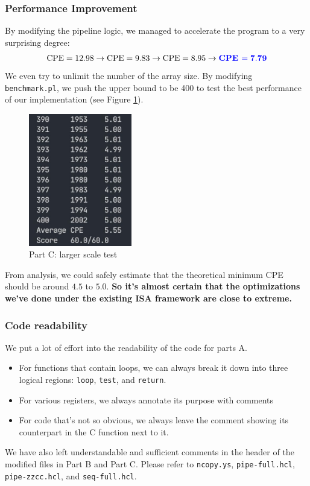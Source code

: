 \documentclass[12pt,a4paper]{article}
\begin{document}
\subsubsection{Performance Improvement}
By modifying the pipeline logic, we managed to accelerate the program to a very surprising degree:
$$
        \text{CPE} = 12.98 \rightarrow \text{CPE} = 9.83 \rightarrow \text{CPE} = 8.95 \rightarrow {\color{blue}\textbf{CPE }\mathbf{= 7.79}}
$$
We even try to unlimit the number of the array size. By modifying \texttt{benchmark.pl}, 
we push the upper bound to be 400 to test the best performance of our implementation (see Figure \ref{Fig.partC-limit}).
\begin{figure}[H] %
        \centering %
        \includegraphics[width=0.4\textwidth]{partC-larger-scale-test.jpg} %
        \caption{Part C: larger scale test} %
        \label{Fig.partC-limit} %
\end{figure}
From analysis, we could safely estimate that the theoretical minimum CPE should be around $4.5$ to $5.0$. \textbf{So it's almost certain that the optimizations we've done under the existing ISA framework are close to extreme.}
\subsubsection{Code readability}
We put a lot of effort into the readability of the code for parts A.
\begin{itemize}
        \item For functions that contain loops, we can always break it down into three logical regions: \texttt{loop}, \texttt{test}, and \texttt{return}.
        \item For various registers, we always annotate its purpose with comments
        \item For code that's not so obvious, we always leave the comment showing its counterpart in the C function next to it.
\end{itemize}
We have also left understandable and sufficient comments in the header of the modified files in Part B and Part C. Please refer to \texttt{ncopy.ys}, \texttt{pipe-full.hcl}, \texttt{pipe-zzcc.hcl}, and \texttt{seq-full.hcl}.
\end{document}
